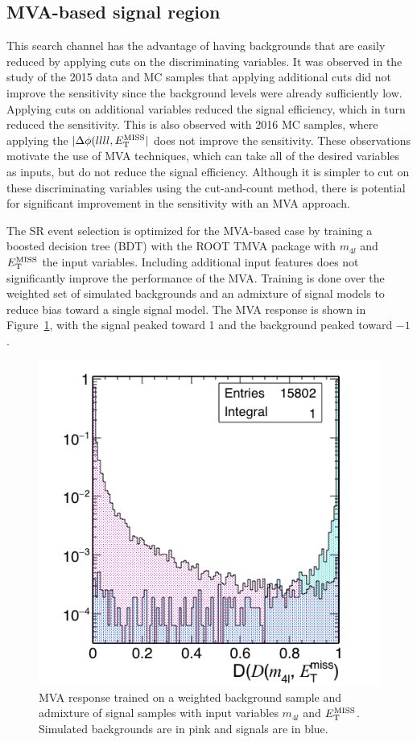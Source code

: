 \subsection{MVA-based signal region} \label{mvaopt}

This search channel has the advantage of having backgrounds that are easily reduced by applying cuts on the discriminating variables. It was observed in the study of the 2015 data and MC samples that applying additional cuts did not improve the sensitivity since the background levels were already sufficiently low. Applying cuts on additional variables reduced the signal efficiency, which in turn reduced the sensitivity. This is also observed with 2016 MC samples, where applying the $|\Delta\phi(llll, E_{\rm{T}}^{\rm{MISS}}|$ does not improve the sensitivity. These observations motivate the use of MVA techniques, which can take all of the desired variables as inputs, but do not reduce the signal efficiency. Although it is simpler to cut on these discriminating variables using the cut-and-count method, there is potential for significant improvement in the sensitivity with an MVA approach.

The SR event selection is optimized for the MVA-based case by training a boosted decision tree (BDT) with the ROOT TMVA package with $m_{4l}$ and $E_{\rm{T}}^{\rm{MISS}}$ the input variables. Including additional input features does not significantly improve the performance of the MVA. Training is done over the weighted set of simulated backgrounds and an admixture of signal models to reduce bias toward a single signal model. The MVA response is shown in Figure~\ref{fig:bdt}, with the signal peaked toward 1 and the background peaked toward $-1$. 

\begin{figure}[tbh]
\centering
\includegraphics[width=5in]{figures/f_Dm4lmet_1D_log.png}
\caption{MVA response trained on a weighted background sample and admixture of signal samples with input variables $m_{4l}$ and $E_{\rm{T}}^{\rm{MISS}}$. Simulated backgrounds are in pink and signals are in blue.}
\label{fig:bdt}
\end{figure}

